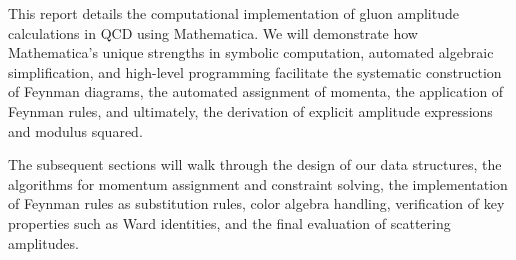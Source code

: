 \documentclass[main.tex]{subfiles}
\begin{document}

This report details the computational implementation of gluon amplitude calculations in QCD using Mathematica. 
We will demonstrate how Mathematica's unique strengths in symbolic computation, automated algebraic simplification, and high-level programming facilitate 
the systematic construction of Feynman diagrams, the automated assignment of momenta, the application of Feynman rules, and ultimately, the derivation of 
explicit amplitude expressions and modulus squared.

The subsequent sections will walk through the design of our data structures, the algorithms for momentum assignment and 
constraint solving, the implementation of Feynman rules as substitution rules, color algebra handling, verification
of key properties such as Ward identities, and the final evaluation of scattering amplitudes.
\end{document}
